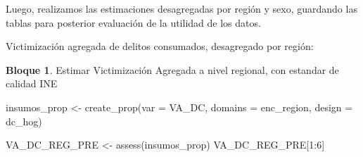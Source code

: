 \documentclass[
]{book}
\newenvironment{Shaded}{\begin{snugshade}}{\end{snugshade}}
\newcommand{\AttributeTok}[1]{\textcolor[rgb]{0.77,0.63,0.00}{#1}}
\newcommand{\DecValTok}[1]{\textcolor[rgb]{0.00,0.00,0.81}{#1}}
\newcommand{\FunctionTok}[1]{\textcolor[rgb]{0.00,0.00,0.00}{#1}}
\newcommand{\NormalTok}[1]{#1}
\newcommand{\OtherTok}[1]{\textcolor[rgb]{0.56,0.35,0.01}{#1}}
\newcommand{\SpecialCharTok}[1]{\textcolor[rgb]{0.00,0.00,0.00}{#1}}
\newcommand{\StringTok}[1]{\textcolor[rgb]{0.31,0.60,0.02}{#1}}
\theoremstyle{definition}
\theoremstyle{definition}
\newtheorem{example}{Bloque}[chapter]
\theoremstyle{definition}
\theoremstyle{definition}
\theoremstyle{remark}
\begin{document}
\begin{Shaded}
\end{Shaded}

Luego, realizamos las estimaciones desagregadas por región y sexo, guardando las tablas para posterior evaluación de la utilidad de los datos.

Victimización agregada de delitos consumados, desagregado por región:

\begin{example}
\protect\hypertarget{exm:bloque10nbm}{}\label{exm:bloque10nbm}Estimar Victimización Agregada a nivel regional, con estandar de calidad INE
\end{example}

\begin{Shaded}
\begin{Highlighting}[]
\NormalTok{insumos\_prop }\OtherTok{\textless{}{-}} \FunctionTok{create\_prop}\NormalTok{(}\AttributeTok{var =} \StringTok{\textquotesingle{}VA\_DC\textquotesingle{}}\NormalTok{, }
                                   \AttributeTok{domains =} \StringTok{\textquotesingle{}enc\_region\textquotesingle{}}\NormalTok{, }
                                   \AttributeTok{design =}\NormalTok{  dc\_hog)}

\NormalTok{VA\_DC\_REG\_PRE }\OtherTok{\textless{}{-}} \FunctionTok{assess}\NormalTok{(insumos\_prop)}
\NormalTok{VA\_DC\_REG\_PRE[}\DecValTok{1}\SpecialCharTok{:}\DecValTok{6}\NormalTok{]}
\end{Highlighting}
\end{Shaded}
\end{document}
